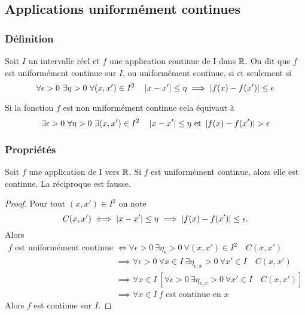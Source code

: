 \subsection{Applications uniformément continues}

\subsubsection{Définition}

\begin{defdef}
  Soit $I$ un intervalle réel et $f$ une application continue de I dans $\mathbb{R}$. On dit que $f$ est uniformément continue sur $I$, ou uniformément continue, si et seulement si
  \begin{equation}
    \forall \epsilon > 0 \ \exists \eta > 0 \ \forall (x,x') \in I^2 \quad \abs{x-x'} \leq \eta \implies \abs{f(x)-f(x')} \leq \epsilon
  \end{equation}
\end{defdef}
Si la fonction $f$ est non uniformément continue cela équivaut à
\begin{equation}
  \exists \epsilon > 0 \ \forall \eta > 0 \ \exists (x,x') \in I^2 \quad \abs{x-x'} \leq \eta \text{~et~} \abs{f(x)-f(x')} > \epsilon
\end{equation}

\subsubsection{Propriétés}

\begin{theo}
  Soit $f$ une application de I vers $\mathbb{R}$. Si $f$ est uniformément continue, alors elle est continue. La réciproque est fausse.
\end{theo}
\begin{proof}
  Pour tout $(x,x') \in I^2$ on note
  \begin{equation}
    C(x,x') \iff \left\lvert x-x'\right\rvert \leq \eta \implies \left\lvert f(x)-f(x')\right\rvert \leq \epsilon.
  \end{equation}
  Alors
  \begin{align}
    f \text{~est uniformément continue} &\iff \forall \epsilon > 0 \ \exists \eta_{\epsilon} > 0 \ \forall (x,x') \in I^2 \quad C(x,x')\\
    &\implies \forall \epsilon > 0 \ \forall x \in I \ \exists \eta_{\epsilon, x} > 0 \ \forall x' \in I \quad C(x,x')\\
    &\implies \forall x \in I \ \left[\forall \epsilon > 0 \ \exists \eta_{\epsilon, x} > 0 \ \forall x' \in I \quad C(x,x')\right]\\
    &\implies \forall x \in I \ f \text{~est continue en } x 
  \end{align}
Alors $f$ est continue sur $I$.
\end{proof}


